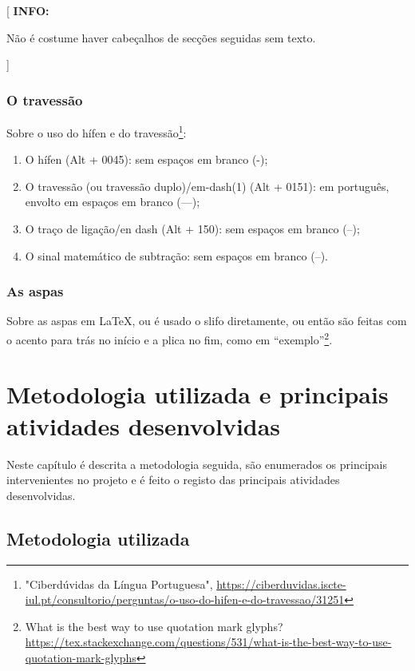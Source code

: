\documentclass[11pt,a4paper]{report}
\newenvironment{info}[1]{\vspace*{6mm}\color{blue}[ \textbf{INFO:} \begin{em} #1}
                        {\vspace*{3mm}\end{em} ]}
\begin{document}
\begin{info}
Não é costume haver cabeçalhos de secções seguidas sem texto.
\end{info}

\subsection*{O travessão}

Sobre o uso do hífen e do travessão\footnote{"Ciberdúvidas da Língua Portuguesa", \url{https://ciberduvidas.iscte-iul.pt/consultorio/perguntas/o-uso-do-hifen-e-do-travessao/31251}}: 
\begin{enumerate}
    \item O hífen (Alt + 0045): sem espaços em branco (-);
    \item O travessão (ou travessão duplo)/em-dash(1) (Alt + 0151): em português, envolto em espaços em branco (---);
    \item O traço de ligação/en dash (Alt + 150): sem espaços em branco (--);
    \item O sinal matemático de subtração: sem espaços em branco (–).
\end{enumerate}

\subsection*{As aspas}

Sobre as aspas  em \LaTeX, ou é usado o slifo diretamente, ou então são feitas com o acento para trás no início e a plica no fim, como em ``exemplo''\footnote{What is the best way to use quotation mark glyphs? 
\url{https://tex.stackexchange.com/questions/531/what-is-the-best-way-to-use-quotation-mark-glyphs}}.


\chapter{Metodologia utilizada e principais atividades desenvolvidas}\label{chap:metodo}

Neste capítulo é descrita a metodologia seguida, são enumerados os
principais intervenientes no projeto e é feito o registo das
principais atividades desenvolvidas.

\section{Metodologia utilizada}
\end{document}
